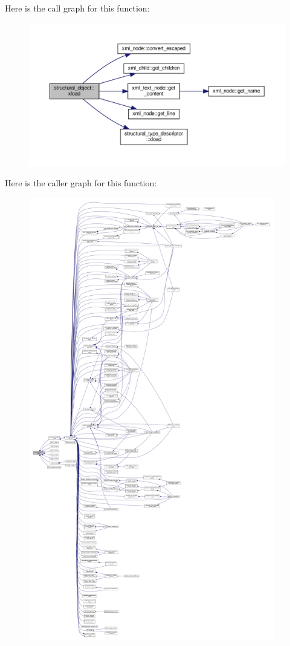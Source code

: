 Here is the call graph for this function\+:
\nopagebreak
\begin{figure}[H]
\begin{center}
\leavevmode
\includegraphics[width=350pt]{d8/da3/classstructural__object_a9a964af7fe7e95b34d03bb514756bb33_cgraph}
\end{center}
\end{figure}
Here is the caller graph for this function\+:
\nopagebreak
\begin{figure}[H]
\begin{center}
\leavevmode
\includegraphics[height=550pt]{d8/da3/classstructural__object_a9a964af7fe7e95b34d03bb514756bb33_icgraph}
\end{center}
\end{figure}
